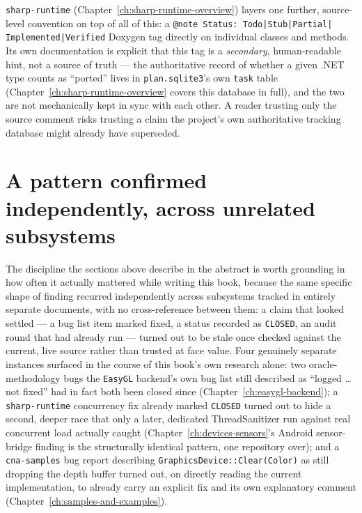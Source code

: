 \texttt{sharp-runtime} (Chapter~\ref{ch:sharp-runtime-overview}) layers one further,
source-level convention on top of all of this: a \texttt{@note Status: Todo|Stub|Partial|%
Implemented|Verified} Doxygen tag directly on individual classes and methods. Its own
documentation is explicit that this tag is a \emph{secondary}, human-readable hint, not a
source of truth --- the authoritative record of whether a given .NET type counts as ``ported''
lives in \texttt{plan.sqlite3}'s own \texttt{task} table (Chapter~\ref{ch:sharp-runtime-overview}
covers this database in full), and the two are not mechanically kept in sync with each other.
A reader trusting only the source comment risks trusting a claim the project's own
authoritative tracking database might already have superseded.

\section{A pattern confirmed independently, across unrelated subsystems}

The discipline the sections above describe in the abstract is worth grounding in how often it
actually mattered while writing this book, because the same specific shape of finding recurred
independently across subsystems tracked in entirely separate documents, with no cross-reference
between them: a claim that looked settled --- a bug list item marked fixed, a status recorded
as \texttt{CLOSED}, an audit round that had already run --- turned out to be stale once checked
against the current, live source rather than trusted at face value. Four genuinely separate
instances surfaced in the course of this book's own research alone: two oracle-methodology
bugs the \texttt{EasyGL} backend's own bug list still described as ``logged \dots{} not fixed''
had in fact both been closed since (Chapter~\ref{ch:easygl-backend}); a
\texttt{sharp-runtime} concurrency fix already marked \texttt{CLOSED} turned out to hide a
second, deeper race that only a later, dedicated ThreadSanitizer run against real concurrent
load actually caught (Chapter~\ref{ch:devices-sensors}'s Android sensor-bridge finding is the
structurally identical pattern, one repository over); and a \texttt{cna-samples} bug report
describing \texttt{GraphicsDevice::Clear(Color)} as still dropping the depth buffer turned out,
on directly reading the current implementation, to already carry an explicit fix and its own
explanatory comment (Chapter~\ref{ch:samples-and-examples}).

